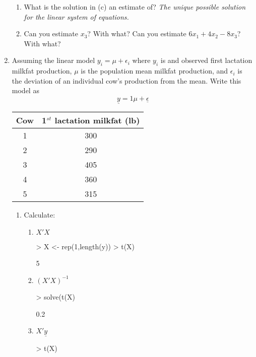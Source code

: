 \documentclass[12pt,a4paper]{paper}
\begin{document}
\begin{enumerate}
\begin{enumerate}
\item What is the solution in (c) an estimate of? \emph{The unique possible solution for the linear system of equations.}
\item Can you estimate $x_{3}$? With what? Can you estimate $6x_{1} + 4x_{2} - 8x_{3}$? With what?
\end{enumerate}
\item Assuming the linear model $y_{i} = \mu + \epsilon_{i}$ where $y_{i}$ is and observed first lactation milkfat production, $\mu$ is the population mean milkfat production, and $\epsilon_{i}$ is the deviation of an individual cow's production from the mean. Write this model as \[\underline{y} = 1\mu + \underline{\epsilon}\]
\begin{center}
\begin{tabular}{|c|c|}
\hline
Cow & 1$^{st}$ lactation milkfat (lb)\\
\hline\hline
1&300\\
\hline
2&290\\
\hline
3&405\\
\hline
4&360\\
\hline
5&315\\
\hline
\end{tabular}
\end{center}
\begin{enumerate}
\item Calculate:
\begin{enumerate}
\item $X'X$
\begin{Schunk}
\begin{Sinput}
> X <- rep(1,length(y))
> t(X) %*% X
\end{Sinput}
\begin{Soutput}
     [,1]
[1,]    5
\end{Soutput}
\end{Schunk}
\item $(X'X)^{-1}$
\begin{Schunk}
\begin{Sinput}
> solve(t(X) %*% X)
\end{Sinput}
\begin{Soutput}
     [,1]
[1,]  0.2
\end{Soutput}
\end{Schunk}
\item $X'\underline{y}$
\begin{Schunk}
\begin{Sinput}
> t(X) %*% y
\end{Sinput}
\begin{Soutput}

\end{Soutput}
\end{Schunk}
\end{enumerate}
\end{enumerate}
\end{enumerate}
\end{document}
